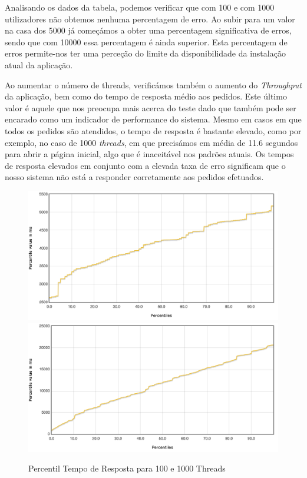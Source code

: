 \vspace{2cm}

Analisando os dados da tabela, podemos verificar que com 100 e com 1000 utilizadores não obtemos nenhuma percentagem de erro. Ao subir para um valor na casa dos 5000 já começámos a obter uma percentagem significativa de erros, sendo que com 10000 essa percentagem é ainda superior. Esta percentagem de erros permite-nos ter uma perceção do limite da disponibilidade da instalação atual da aplicação. 

Ao aumentar o número de threads, verificámos também o aumento do \textit{Throughput} da aplicação, bem como do tempo de resposta médio aos pedidos. Este último valor é aquele que nos preocupa mais acerca do teste dado que também pode ser encarado como um indicador de performance do sistema. Mesmo em casos em que todos os pedidos são atendidos, o tempo de resposta é bastante elevado, como por exemplo, no caso de 1000 \textit{threads}, em que precisámos em média de 11.6 segundos para abrir a página inicial, algo que é inaceitável nos padrões atuais. Os tempos de resposta elevados em conjunto com a elevada taxa de erro significam que o nosso sistema não está a responder corretamente aos pedidos efetuados. 

\begin{figure}[ht!]
    \centering
    \includegraphics[width=.45\linewidth]{img/testes/i-t1-100.png}
    \includegraphics[width=.45\linewidth]{img/testes/i-t1-1000.png}
    \caption{Percentil Tempo de Resposta para 100 e 1000 Threads}
\end{figure}

